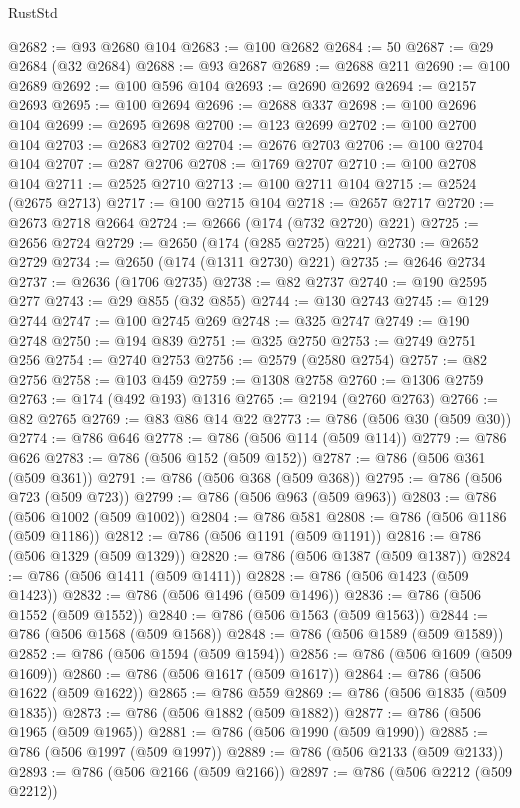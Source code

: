 \begin{lexlean}{RustStd}
\begin{coremodule}
@2682 := @93 @2680 @104
@2683 := @100 @2682
@2684 := 50
@2687 := @29 @2684 (@32 @2684)
@2688 := @93 @2687
@2689 := @2688 @211
@2690 := @100 @2689
@2692 := @100 @596 @104
@2693 := @2690 @2692
@2694 := @2157 @2693
@2695 := @100 @2694
@2696 := @2688 @337
@2698 := @100 @2696 @104
@2699 := @2695 @2698
@2700 := @123 @2699
@2702 := @100 @2700 @104
@2703 := @2683 @2702
@2704 := @2676 @2703
@2706 := @100 @2704 @104
@2707 := @287 @2706
@2708 := @1769 @2707
@2710 := @100 @2708 @104
@2711 := @2525 @2710
@2713 := @100 @2711 @104
@2715 := @2524 (@2675 @2713)
@2717 := @100 @2715 @104
@2718 := @2657 @2717
@2720 := @2673 @2718 @2664
@2724 := @2666 (@174 (@732 @2720) @221)
@2725 := @2656 @2724
@2729 := @2650 (@174 (@285 @2725) @221)
@2730 := @2652 @2729
@2734 := @2650 (@174 (@1311 @2730) @221)
@2735 := @2646 @2734
@2737 := @2636 (@1706 @2735)
@2738 := @82 @2737
@2740 := @190 @2595 @277
@2743 := @29 @855 (@32 @855)
@2744 := @130 @2743
@2745 := @129 @2744
@2747 := @100 @2745 @269
@2748 := @325 @2747
@2749 := @190 @2748
@2750 := @194 @839
@2751 := @325 @2750
@2753 := @2749 @2751 @256
@2754 := @2740 @2753
@2756 := @2579 (@2580 @2754)
@2757 := @82 @2756
@2758 := @103 @459
@2759 := @1308 @2758
@2760 := @1306 @2759
@2763 := @174 (@492 @193) @1316
@2765 := @2194 (@2760 @2763)
@2766 := @82 @2765
@2769 := @83 @86 @14 @22
@2773 := @786 (@506 @30 (@509 @30))
@2774 := @786 @646
@2778 := @786 (@506 @114 (@509 @114))
@2779 := @786 @626
@2783 := @786 (@506 @152 (@509 @152))
@2787 := @786 (@506 @361 (@509 @361))
@2791 := @786 (@506 @368 (@509 @368))
@2795 := @786 (@506 @723 (@509 @723))
@2799 := @786 (@506 @963 (@509 @963))
@2803 := @786 (@506 @1002 (@509 @1002))
@2804 := @786 @581
@2808 := @786 (@506 @1186 (@509 @1186))
@2812 := @786 (@506 @1191 (@509 @1191))
@2816 := @786 (@506 @1329 (@509 @1329))
@2820 := @786 (@506 @1387 (@509 @1387))
@2824 := @786 (@506 @1411 (@509 @1411))
@2828 := @786 (@506 @1423 (@509 @1423))
@2832 := @786 (@506 @1496 (@509 @1496))
@2836 := @786 (@506 @1552 (@509 @1552))
@2840 := @786 (@506 @1563 (@509 @1563))
@2844 := @786 (@506 @1568 (@509 @1568))
@2848 := @786 (@506 @1589 (@509 @1589))
@2852 := @786 (@506 @1594 (@509 @1594))
@2856 := @786 (@506 @1609 (@509 @1609))
@2860 := @786 (@506 @1617 (@509 @1617))
@2864 := @786 (@506 @1622 (@509 @1622))
@2865 := @786 @559
@2869 := @786 (@506 @1835 (@509 @1835))
@2873 := @786 (@506 @1882 (@509 @1882))
@2877 := @786 (@506 @1965 (@509 @1965))
@2881 := @786 (@506 @1990 (@509 @1990))
@2885 := @786 (@506 @1997 (@509 @1997))
@2889 := @786 (@506 @2133 (@509 @2133))
@2893 := @786 (@506 @2166 (@509 @2166))
@2897 := @786 (@506 @2212 (@509 @2212))

\end{coremodule}
\end{lexlean}
